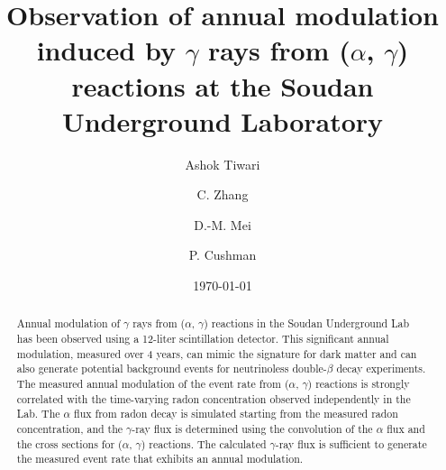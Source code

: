 \documentclass[aps,prc,showpacs,twocolumn,superscriptaddress]{revtex4-1}
\begin{document}

\title{Observation of annual modulation induced by $\gamma$ rays from ($\alpha$, $\gamma$) reactions at the Soudan Underground Laboratory}%
\author{Ashok Tiwari}
 \author{C. Zhang}
\author{D.-M. Mei} 
\author{P. Cushman}
\date{\today}%
\begin{abstract}
Annual modulation of $\gamma$ rays from ($\alpha$, $\gamma$) reactions in the Soudan Underground Lab has been observed using a 12-liter scintillation detector. This significant annual modulation, measured over 4 years, can mimic the signature for dark matter and can also generate potential background events for neutrinoless double-$\beta$ decay experiments. The measured annual modulation of the event rate from  ($\alpha$, $\gamma$) reactions is strongly correlated with the time-varying radon concentration observed independently in the Lab. The $\alpha$ flux from radon decay is simulated starting from the measured radon concentration, and the $\gamma$-ray flux is determined using the convolution of the $\alpha$ flux and the cross sections for ($\alpha$, $\gamma$) reactions. The calculated $\gamma$-ray flux is sufficient to generate the measured event rate that exhibits an annual modulation.            
\end{abstract}
\maketitle
\end{document}
